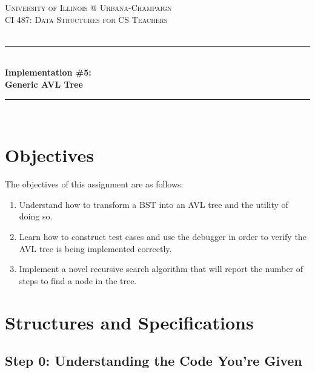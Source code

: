 \documentclass[a4paper]{article}
\begin{document}
\begin{titlepage}

\newcommand{\HRule}{\rule{\linewidth}{0.5mm}} 							%
\center 
 
\textsc{\LARGE University of Illinois @ Urbana-Champaign}\\[1cm]

\textsc{\Large CI 487: Data Structures for CS Teachers}\\[0.2cm]
\textsc{\large }\\[1cm] 										%
\HRule \\[0.8cm]
{ \huge \bfseries Implementation \#5:\\\vspace{0.1cm}Generic AVL Tree}\\[0.7cm]								%
\HRule \\[0.8cm]
\vfill 
\end{titlepage}


\section{Objectives }

The objectives of this assignment are as follows:
\begin{enumerate}
	\item Understand how to transform a BST into an AVL tree and the utility of doing so.
	\item Learn how to construct test cases and use the debugger in order to verify the AVL tree is being implemented correctly.
	\item Implement a novel recursive search algorithm that will report the number of steps to find a node in the tree.
\end{enumerate}

\section{Structures and Specifications}

\subsection{Step 0: Understanding the Code You're Given} 
\end{document}
